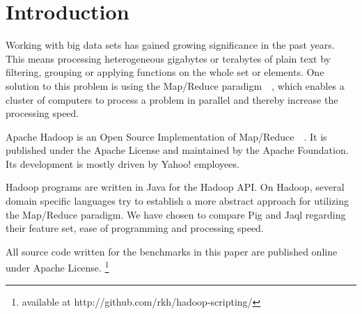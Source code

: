 \section{Introduction}

Working with big data sets has gained growing significance in the past years. This means processing heterogeneous gigabytes or terabytes of plain text by filtering, grouping or applying functions on the whole set or elements. One solution to this problem is using the Map/Reduce paradigm~\cite{googleMapReduce}~, which enables a cluster of computers to process a problem in parallel and thereby increase the processing speed.

Apache Hadoop is an Open Source Implementation of Map/Reduce~\cite{hadoopWebsite}~. It is published under the Apache License and maintained by the Apache Foundation. Its development is mostly driven by Yahoo! employees.

Hadoop programs are written in Java for the Hadoop API. On Hadoop, several domain specific languages try to establish a more abstract approach for utilizing the Map/Reduce paradigm. We have chosen to compare Pig and Jaql regarding their feature set, ease of programming and processing speed.

All source code written for the benchmarks in this paper are published online under Apache License. \footnote{available at http://github.com/rkh/hadoop-scripting/}